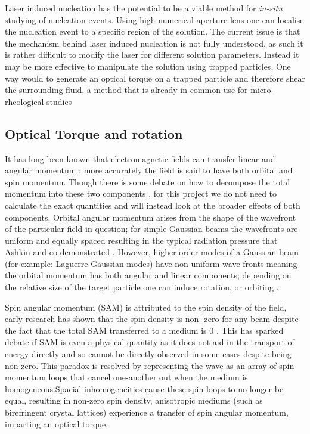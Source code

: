 Laser induced nucleation has the potential to be a viable method 
for \textit{in-situ} studying of nucleation events. Using high 
numerical aperture lens one can localise the nucleation event 
to a specific region of the solution. The current issue is that 
the mechanism behind laser induced nucleation is not fully 
understood, as such it is rather difficult to modify the laser 
for different solution parameters. Instead it may be more 
effective to manipulate the solution using trapped particles. 
One way would to generate an optical torque on a trapped particle
and therefore shear the surrounding fluid, a method that is 
already in common use for micro-rheological studies \cite{Bishop2004, 
RobertsonAnderson2018}

\subsection{Optical Torque and rotation}
\label{sec:opt_torque}
It has long been known that electromagnetic fields can transfer
linear and angular momentum \cite{Beth1936MechanicalDA}; more 
accurately the field is said to have both orbital and spin momentum. 
Though there is some debate on how to decompose the total momentum 
into these two components \cite{Bruce2020, Svak2018}, for this 
project we do not need to calculate the exact quantities and will 
instead look at the broader effects of both components. Orbital 
angular momentum arises from the shape of the wavefront of the 
particular field in question; for simple Gaussian beams the wavefronts 
are uniform and equally spaced resulting in the typical radiation 
pressure that Ashkin and co demonstrated \cite{Ashkin1980}. However, 
higher order modes of a Gaussian beam (for example: Laguerre-Gaussian 
modes) have non-uniform wave fronts meaning the orbital momentum has 
both angular and linear components; depending on the relative size 
of the target particle one can induce rotation, or orbiting 
\cite{Bruce2020, Courtial2000}. 

Spin angular momentum (SAM) is attributed to the spin density of 
the field, early research has shown that the spin density is non-
zero for any beam despite the fact that the total SAM transferred 
to a medium is 0 \cite{Svak2018, Bliokh2014}. This has sparked 
debate if SAM is even a physical quantity as it does not aid in 
the transport of energy directly \cite{Bliokh2014} and so cannot 
be directly observed in some cases despite being non-zero. This 
paradox is resolved by representing the wave as an array of spin 
momentum loops that cancel one-another out when the medium is 
homogeneous.Spacial inhomogeneities cause these spin loops to no 
longer be equal, resulting in non-zero spin density, anisotropic 
mediums (such as birefringent crystal lattices) experience a 
transfer of spin angular momentum, imparting an optical torque.

